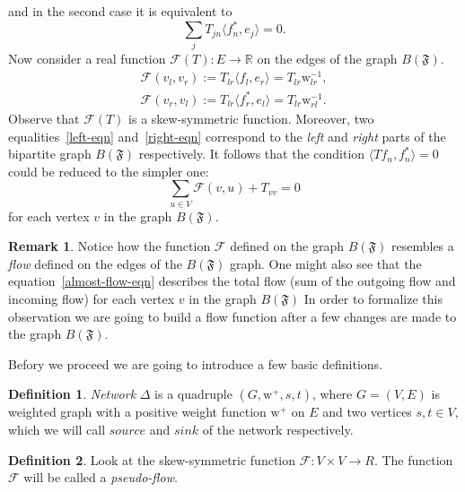 \documentclass[12pt]{article}
\newcommand\inner[2]{\langle #1, #2 \rangle}
\theoremstyle{definition}
\newtheorem{remark}{Remark}
\newtheorem{definition}{Definition}
\newcommand{\fsys}{\mathfrak{F}}
\newcommand{\wt}{\mathrm{w}}
\newcommand{\wtp}{\mathrm{w}^{+}}
\newcommand{\flow}{\mathcal{F}}
\newcommand{\flowsgn}{\flow}
\newcommand{\source}{\mathit{source}}
\newcommand{\sink}{\mathit{sink}}
\newcommand{\net}{\Delta}
\numberwithin{remark}{section}
\numberwithin{theorem}{section}
\numberwithin{prop}{section}
\numberwithin{equation}{section}
\numberwithin{lemma}{section}
\numberwithin{prop_under_lemma}{lemma}
\begin{document}
    and in the second case it is equivalent to 
    \begin{equation}
        \label{right-eqn}
        \sum_j T_{jn} \inner{f^*_n}{e_j} = 0.
    \end{equation}
    Now consider a real function $\flowsgn(T): E \to \mathbb{R}$ 
    on the edges of the graph $B(\fsys)$.
    \begin{align*}
        \flowsgn(v_l, v_r) := T_{lr} \inner{f_l}{e_r} = T_{lr} \wt_{lr}^{-1},\\
        \flowsgn(v_r, v_l) := T_{lr} \inner{f^*_r}{e_l} = T_{lr} \wt_{rl}^{-1}.
    \end{align*}
    Observe that $\flowsgn(T)$ is a skew-symmetric function.
    Moreover, two equalities~\eqref{left-eqn} and~\eqref{right-eqn} correspond to the \textit{left} and \textit{right}
      parts of the bipartite graph $B(\fsys)$ respectively.
    It follows that the condition $\inner{Tf_n}{f_n^*} = 0$ could be reduced to the simpler one:
    \begin{equation}
      \label{almost-flow-eqn}
      \sum_{u \in V} \flowsgn(v, u) + T_{vv} = 0
    \end{equation}
      for each vertex $v$ in the graph $B(\fsys)$.
    \begin{remark}
      Notice how the function $\flow$ defined on the graph $B(\fsys)$ resembles
      a \emph{flow} defined on the edges of the $B(\fsys)$ graph.
      One might also see that the equation~\eqref{almost-flow-eqn} describes the total flow (sum of the outgoing flow and incoming flow) 
      for each vertex $v$ in the graph $B(\fsys)$
      In order to formalize this observation we are going to build a flow function
      after a few changes are made to the graph $B(\fsys)$.
    \end{remark}
    Befory we proceed we are going to introduce a few basic definitions.
    \begin{definition}
        \emph{Network} $\net$ is a quadruple $(G, \wtp, s, t)$, where $G = (V, E)$ is weighted graph 
        with a positive weight function $\wtp$ on $E$ and two vertices $s, t \in V$, which
        we will call $\source$ and $\sink$ of the network respectively.
    \end{definition}
    \begin{definition}
        Look at the skew-symmetric function $\flow: V \times V \to R$.
        The function $\flow$ will be called a \emph{pseudo-flow}.
    \end{definition}
\end{document}

